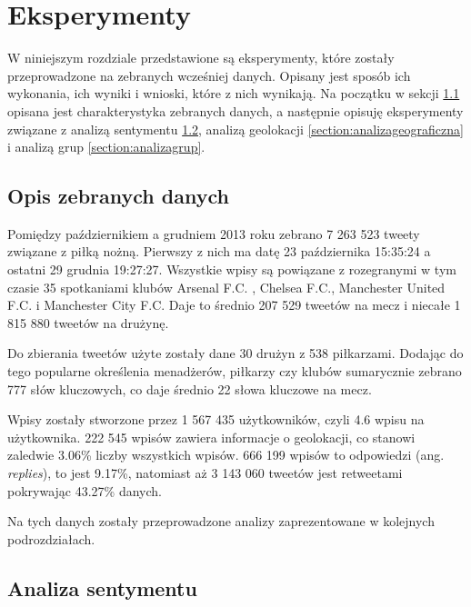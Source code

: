 \chapter{Eksperymenty}
W niniejszym rozdziale przedstawione są eksperymenty, które zostały
przeprowadzone na zebranych wcześniej danych.
Opisany jest sposób ich wykonania, ich wyniki i wnioski, które z nich wynikają.
Na początku w sekcji \ref{section:opisdanych} opisana jest charakterystyka
zebranych danych, a następnie opisuję eksperymenty związane z analizą sentymentu
\ref{section:analizasentymentu2}, analizą geolokacji
\ref{section:analizageograficzna} i analizą grup \ref{section:analizagrup}.


\section{Opis zebranych danych}
\label{section:opisdanych}

Pomiędzy październikiem a grudniem 2013 roku zebrano 7 263 523 tweety związane
z piłką nożną. Pierwszy z nich ma datę 23 października 15:35:24 a ostatni
29 grudnia 19:27:27. Wszystkie wpisy są powiązane z rozegranymi w tym czasie
35 spotkaniami klubów Arsenal F.C. , Chelsea F.C., Manchester United F.C. i
Manchester City F.C. Daje to średnio 207 529 tweetów na mecz i niecałe
1 815 880 tweetów na drużynę.

Do zbierania tweetów użyte zostały dane 30 drużyn z 538 piłkarzami.
Dodając do tego popularne określenia menadżerów, piłkarzy czy klubów sumarycznie
zebrano 777 słów kluczowych, co daje średnio 22 słowa kluczowe na mecz.

Wpisy zostały stworzone przez 1 567 435 użytkowników, czyli 4.6 
wpisu na użytkownika. 222 545 wpisów zawiera informacje o geolokacji, co stanowi
zaledwie 3.06\% liczby wszystkich wpisów. 666 199 wpisów to odpowiedzi 
(ang. \textit{replies}), to jest 9.17\%, natomiast aż 3 143 060 tweetów
jest retweetami pokrywając 43.27\% danych.

Na tych danych zostały przeprowadzone analizy zaprezentowane w kolejnych podrozdziałach.



\section{Analiza sentymentu}
\label{section:analizasentymentu2}
